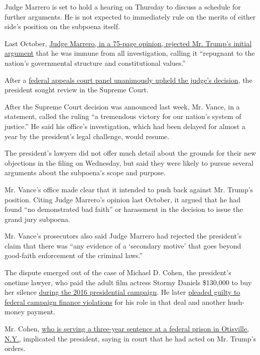 Judge Marrero is set to hold a hearing on Thursday to discuss a schedule
for further arguments. He is not expected to immediately rule on the
merits of either side's position on the subpoena itself.

Last October,
\href{https://www.nytimes.com/2019/10/07/nyregion/trump-taxes-lawsuit-vance.html}{Judge
Marrero, in a 75-page opinion, rejected Mr. Trump's initial argument}
that he was immune from all investigation, calling it ``repugnant to the
nation's governmental structure and constitutional values.''

After a
\href{https://www.nytimes.com/2019/11/04/nyregion/trump-taxes-vance-appeal.html}{federal
appeals court panel unanimously upheld the judge's decision}, the
president sought review in the Supreme Court.

After the Supreme Court decision was announced last week, Mr. Vance, in
a statement, called the ruling ``a tremendous victory for our nation's
system of justice.'' He said his office's investigation, which had been
delayed for almost a year by the president's legal challenge, would
resume.

The president's lawyers did not offer much detail about the grounds for
their new objections in the filing on Wednesday, but said they were
likely to pursue several arguments about the subpoena's scope and
purpose.

Mr. Vance's office made clear that it intended to push back against Mr.
Trump's position. Citing Judge Marrero's opinion last October, it argued
that he had found ``no demonstrated bad faith'' or harassment in the
decision to issue the grand jury subpoena.

Mr. Vance's prosecutors also said Judge Marrero had rejected the
president's claim that there was ``any evidence of a `secondary motive'
that goes beyond good-faith enforcement of the criminal laws.''

The dispute emerged out of the case of Michael D. Cohen, the president's
onetime lawyer, who paid the adult film actress Stormy Daniels \$130,000
to buy her silence
\href{https://www.nytimes.com/2019/08/01/nyregion/trump-cohen-stormy-daniels-vance.html}{during
the 2016 presidential campaign}. He later
\href{https://www.nytimes.com/2018/11/29/nyregion/michael-cohen-trump-russia-mueller.html}{pleaded
guilty to federal campaign finance violations} for his role in that deal
and another hush-money payment.

Mr. Cohen,
\href{https://www.nytimes.com/2018/12/12/nyregion/michael-cohen-sentence-trump.html}{who
is serving a three-year sentence at a federal prison in Otisville,
N.Y.}, implicated the president, saying in court that he had acted on
Mr. Trump's orders.

